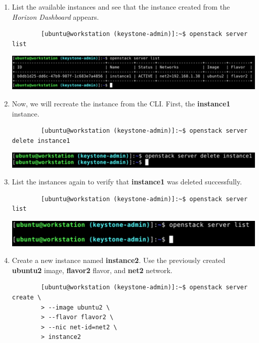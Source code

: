 \documentclass[letterpaper, 12pt]{article}
\begin{document}
\begin{enumerate}
    \item List the available instances and see that the instance created from the \textit{Horizon Dashboard} appears.
    \begin{lstlisting}
        [ubuntu@workstation (keystone-admin)]:~$ openstack server list
    \end{lstlisting}

    \begin{center}
        \includegraphics[width=\linewidth]{images/part4/step9.png}
    \end{center}

    \item Now, we will recreate the instance from the CLI.
    First, the \textbf{instance1} instance.
    \begin{lstlisting}
        [ubuntu@workstation (keystone-admin)]:~$ openstack server delete instance1
    \end{lstlisting}

    \begin{center}
        \includegraphics[width=\linewidth]{images/part4/step10.png}
    \end{center}

    \item List the instances again to verify that \textbf{instance1} was deleted successfully.
    \begin{lstlisting}
        [ubuntu@workstation (keystone-admin)]:~$ openstack server list
    \end{lstlisting}

    \begin{center}
        \includegraphics[width=\linewidth]{images/part4/step11.png}
    \end{center}

    \item Create a new instance named \textbf{instance2}.
    Use the previously created \textbf{ubuntu2} image, \textbf{flavor2} flavor, and \textbf{net2} network.
    \begin{lstlisting}
        [ubuntu@workstation (keystone-admin)]:~$ openstack server create \
        > --image ubuntu2 \
        > --flavor flavor2 \
        > --nic net-id=net2 \
        > instance2
    \end{lstlisting}


\end{enumerate}
\end{document}
